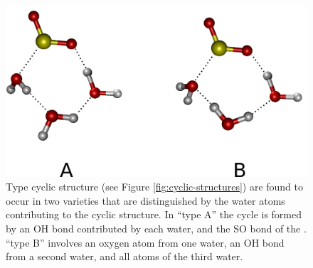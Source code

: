 \begin{figure}[h!]
	\begin{center}
		\includegraphics[scale=1.0]{images/cycles/triple-cycle-types-small.png}
		\caption{Type  cyclic structure (see Figure \ref{fig:cyclic-structures}) are found to occur in two varieties that are distinguished by the water atoms contributing to the cyclic structure. In ``type A'' the cycle is formed by an OH bond contributed by each water, and the SO bond of the \suldiox. ``type B'' involves an oxygen atom from one water, an OH bond from a second water, and all atoms of the third water.}
		\label{fig:type-3-varieties}
	\end{center}
\end{figure}
